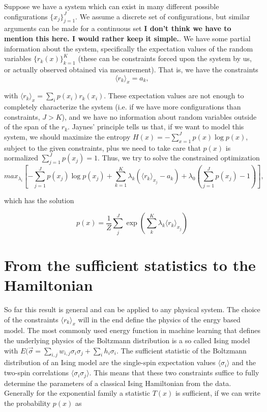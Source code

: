 \documentclass[nofootinbib, superscriptaddress, prl]{revtex4}
\begin{document}
Suppose we have a system which can exist in many different possible configurations $\{x_j\}_{j=1}^J$. We assume a discrete set of configurations, but similar arguments can be made for a continuous set \textbf{I don't think we have to mention this here. I would rather keep it simple.}. We have some partial information about the system, specifically the expectation values of the random variables $\{r_k(x)\}_{k=1}^K$ (these can be constraints forced upon the system by us, or actually observed obtained via measurement). That is, we have the constraints 
\begin{equation}
 \langle r_k \rangle_{x} = a_k,
\end{equation}

with $ \langle r_k \rangle_{x} = \sum_i p(x_i) r_k(x_i)$.
These expectation values are not enough to completely characterize the system (i.e. if we have more configurations than constraints, $J>K$), and we have no information about random variables outside of the span of the $r_k$. Jaynes' principle tells us that, if we want to model this system, we should maximize the entropy $H(x) = -\sum_{x=1}^J p(x) \log p(x)$, subject to the given constraints, plus we need to take care that $p(x)$ is normalized $\sum_{j=1}^J p(x_j) = 1 $. Thus, we try to solve the constrained optimization
\begin{equation}
 \textit{max}_{\lambda_i}[-\sum_{j=1}^J p(x_j) \log p(x_j) + \sum_{k=1}^K \lambda_k (\langle r_k \rangle_{x_j} - a_k) + \lambda_0(\sum_{j=1}^J p(x_j) - 1)],
\end{equation}

which has the solution

\begin{equation}
p(x) = \frac{1}{Z} \sum_j^J \exp \left( \sum_k^K \lambda_k  \langle r_k \rangle_{x_j}\right)
\end{equation}


\section{From the sufficient statistics to the Hamiltonian}

So far this result is general and can be applied to any physical system. The choice of the constraints $\langle r_k \rangle_x$ will in the end define the physics of the enrgy based model. The most commonly used energy function in machine learning that defines the underlying physics of the Boltzmann distribution is a so called Ising model with $E(\vec {\sigma} = \sum_{i,j} w_{i,j} \sigma_i \sigma_j + \sum_i h_i \sigma_i$. 
The sufficient statistic of the Boltzmann distribution of an Ising model are the single-spin expectation values $\langle \sigma_i \rangle$ and the two-spin correlations $\langle \sigma_i \sigma_j \rangle$. This means that these two constraints suffice to fully determine the parameters of a classical Ising Hamiltonian from the data.
Generally for the exponential family a statistic $T(x)$ is sufficient, if we can write the probability $p(x)$ as
\end{document}
